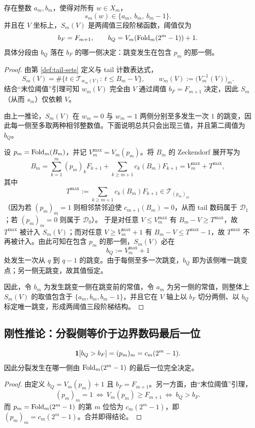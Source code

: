 \begin{theorem}[三值纤维定理]
存在整数 $a_m,b_m$，使得对所有 $w\in X_m$，
$$
s_m(w)\in\{a_m,\ b_m,\ b_m-1\}.
$$
并且在 $V$ 坐标上，$S_m(V)$ 是两阈值三段阶梯函数，阈值仅为
$$
b_F=F_{m+1},\qquad b_Q=V_m(\mathrm{Fold}_m(2^m-1))+1.
$$
具体分段由 $b_Q$ 落在 $b_F$ 的哪一侧决定：跳变发生在包含 $p_m$ 的那一侧。
\end{theorem}

\begin{proof}
由第 \ref{def:tail-sets} 定义与 tail 计数表达式，
$$
S_m(V)=\#\{t\in\mathcal{T}_{w_m(V)}:\ t\le B_m-V\},\qquad w_m(V):=\big(V_m^{-1}(V)\big)_m.
$$
结合“末位阈值”引理可知 $w_m(V)$ 完全由 $V$ 通过阈值 $b_F=F_{m+1}$ 决定，因此 $S_m$（从而 $s_m$）仅依赖 $V$。

由上一推论，$S_m(V)$ 在 $w_m=0$ 与 $w_m=1$ 两侧分别至多发生一次 $1$ 的跳变，因此每一侧至多取两种相邻整数值。下面说明总共只会出现三值，并且第二阈值为 $b_Q$。

设 $p_m=\mathrm{Fold}_m(B_m)$，并记 $V_m^{\max}=V_m(p_m)$。将 $B_m$ 的 Zeckendorf 展开写为
$$
B_m=\sum_{k=1}^{m} (p_m)_kF_{k+1}+\sum_{k\ge m+1} c_k(B_m)F_{k+1}
=V_m^{\max}+T^{\max},
$$
其中
$$
T^{\max}:=\sum_{k\ge m+1} c_k(B_m)F_{k+1}\in\mathcal{T}_{(p_m)_m}
$$
（因为若 $(p_m)_m=1$ 则相邻禁邻迫使 $c_{m+1}(B_m)=0$，从而 tail 数码属于 $\mathcal{D}_1$；若 $(p_m)_m=0$ 则属于 $\mathcal{D}_0$）。
于是对任意 $V\le V_m^{\max}$ 有 $B_m-V\ge T^{\max}$，故 $T^{\max}$ 被计入 $S_m(V)$；而对任意 $V\ge V_m^{\max}+1$ 有 $B_m-V\le T^{\max}-1$，故 $T^{\max}$ 不再被计入。由此可知在包含 $p_m$ 的那一侧，$S_m(V)$ 必在
$$
b_Q:=V_m^{\max}+1
$$
处发生一次从 $q$ 到 $q-1$ 的跳变。由于每侧至多一次跳变，$b_Q$ 即为该侧唯一跳变点；另一侧无跳变，故其值恒定。

因此，令 $b_m$ 为发生跳变一侧在跳变前的常值，令 $a_m$ 为另一侧的常值，则整体上 $S_m(V)$ 的取值包含于 $\{a_m,b_m,b_m-1\}$，并且它在 $V$ 轴上以 $b_F$ 切分两侧、以 $b_Q$ 标定唯一跳变，形成两阈值三段阶梯结构。
\end{proof}

\subsection{刚性推论：分裂侧等价于边界数码最后一位}

\begin{corollary}[分裂侧判别的完全等价]
$$
\mathbf{1}[b_Q>b_F]=(p_m)_m=c_m(2^m-1).
$$
因此分裂发生在哪一侧由 $\mathrm{Fold}_m(2^m-1)$ 的最后一位完全决定。
\end{corollary}

\begin{proof}
由定义 $b_Q=V_m(p_m)+1$ 且 $b_F=F_{m+1}$。另一方面，由“末位阈值”引理，
$$
(p_m)_m=1\ \Longleftrightarrow\ V_m(p_m)\ge F_{m+1}\ \Longleftrightarrow\ b_Q>b_F.
$$
而 $p_m=\mathrm{Fold}_m(2^m-1)$ 的第 $m$ 位恰为 $c_m(2^m-1)$，即 $(p_m)_m=c_m(2^m-1)$。合并即得结论。
\end{proof}

